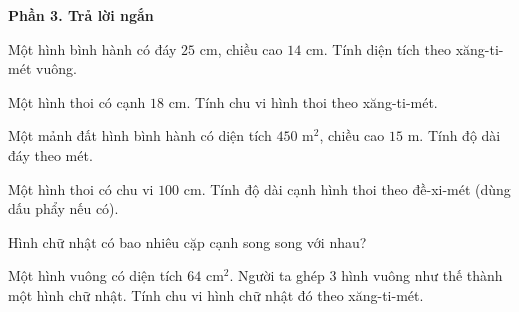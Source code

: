 \textbf{Phần 3. Trả lời ngắn}

\begin{ex} %
Một hình bình hành có đáy $25\text{ cm}$, chiều cao $14\text{ cm}$. Tính diện tích theo xăng-ti-mét vuông.
\end{ex}

\begin{ex} %
Một hình thoi có cạnh $18\text{ cm}$. Tính chu vi hình thoi theo xăng-ti-mét.
\end{ex}

\begin{ex} %
Một mảnh đất hình bình hành có diện tích $450\text{ m}^2$, chiều cao $15\text{ m}$. Tính độ dài đáy theo mét.
\end{ex}

\begin{ex} %
Một hình thoi có chu vi $100\text{ cm}$. Tính độ dài cạnh hình thoi theo đề-xi-mét (dùng dấu phẩy nếu có).
\end{ex}

\begin{ex} %
Hình chữ nhật có bao nhiêu cặp cạnh song song với nhau?
\end{ex}

\begin{ex} %
Một hình vuông có diện tích $64\text{ cm}^2$. Người ta ghép 3 hình vuông như thế thành một hình chữ nhật. Tính chu vi hình chữ nhật đó theo xăng-ti-mét.
\end{ex}
